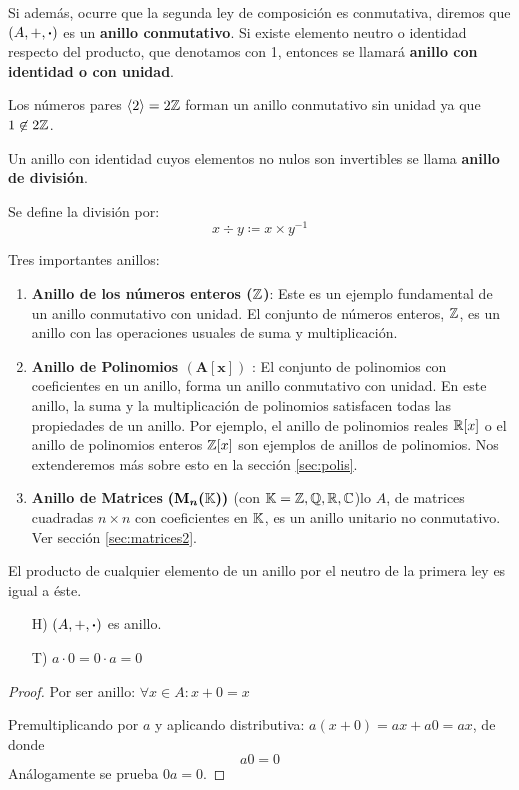 Si además, ocurre que la segunda ley de composición es conmutativa, diremos que $(A, +, \boldsymbol{\cdot})$ es un \textbf{anillo conmutativo}. Si existe elemento neutro o identidad respecto del producto, que denotamos con 1, entonces se llamará \textbf{anillo con identidad o con unidad}.

\begin{example}
	Los números pares $\langle 2 \rangle = 2\mathbb{Z}$ forman un anillo conmutativo sin unidad ya que $1 \not \in 2\mathbb{Z}$.
\end{example}

Un anillo con identidad cuyos elementos no nulos son invertibles se llama \textbf{anillo de división}.

Se define la división por:
\[ x \div y \coloneqq x \times y^{-1} \]

\begin{fmd-example} Tres importantes anillos:
	\begin{enumerate}
		\item \textbf{Anillo de los números enteros ($\boldsymbol{\mathbb{Z}}$)}: Este es un ejemplo fundamental de un anillo conmutativo con unidad. El conjunto de números enteros, $\mathbb{Z}$, es un anillo con las operaciones usuales de suma y multiplicación.
		
		\item \textbf{Anillo de Polinomios $\boldsymbol{(A[x])}$ }: El conjunto de polinomios con coeficientes en un anillo, forma un anillo conmutativo con unidad. En este anillo, la suma y la multiplicación de polinomios satisfacen todas las propiedades de un anillo. Por ejemplo, el anillo de polinomios reales $\mathbb{R}[x]$ o el anillo de polinomios enteros $\mathbb{Z}[x]$ son ejemplos de anillos de polinomios. Nos extenderemos más sobre esto en la sección \ref{sec:polis}.
		
		\item \textbf{Anillo de Matrices} $\boldsymbol{(\mathbf{M}_n(\mathbb{K}))}$ (con $\mathbb{K} = \mathbb{Z}, \mathbb{Q}, \mathbb{R}, \mathbb{C}$)lo $A$, de matrices cuadradas $n \times n$ con coeficientes en $\mathbb{K}$, es un anillo unitario no conmutativo. Ver sección \ref{sec:matrices2}.
	\end{enumerate}
\end{fmd-example}

\begin{proposition}
	El producto de cualquier elemento de un anillo por el neutro de la primera ley es igual a éste.
	\begin{itemize}
		\item[H)] $(A, +, \boldsymbol{\cdot})$ es anillo.
		\item[T)] $a \cdot 0 = 0 \cdot a = 0$
	\end{itemize}
\end{proposition}
\begin{proof}
	Por ser anillo: $\forall x \in A: x + 0 = x$
	
	Premultiplicando por $a$ y aplicando distributiva: $a(x + 0) = ax + a0 = ax$, de donde
	\[ a0 = 0\]
	Análogamente se prueba $0a = 0$.
\end{proof}

